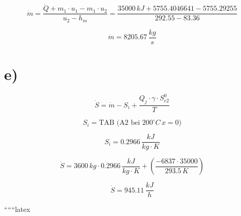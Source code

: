 \[
\dot{m} = \frac{\dot{Q} + m_1 \cdot u_1 - m_1 \cdot u_2}{u_2 - h_m} = \frac{35000 \, kJ + 5755.4046641 - 5755.29255}{292.55 - 83.36}
\]

\[
\dot{m} = 8205.67 \, \frac{kg}{s}
\]

\section*{e)}

\[
\dot{S} = \dot{m} - S_i + \frac{Q_j \cdot \gamma \cdot S_{e2}^0}{T}
\]

\[
S_i = \text{TAB (A2 bei } 200^\circ C \, x = 0)
\]

\[
S_i = 0.2966 \, \frac{kJ}{kg \cdot K}
\]

\[
\dot{S} = 3600 \, kg \cdot 0.2966 \, \frac{kJ}{kg \cdot K} + \left( \frac{-6837 \cdot 35000}{293.5 \, K} \right)
\]

\[
\dot{S} = 945.11 \, \frac{kJ}{h}
\]

``````latex


